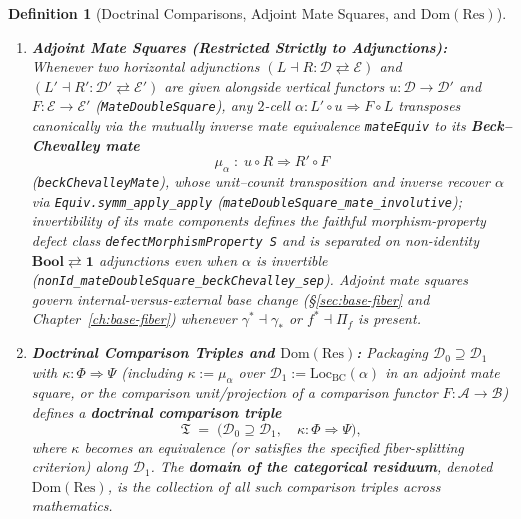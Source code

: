 \documentclass[10pt,twoside,openright]{book}
\theoremstyle{crmplain}
\theoremstyle{crmdef}
\newtheorem{definition}[theorem]{Definition}
\theoremstyle{crmremark}
\begin{document}
\begin{definition}[Doctrinal Comparisons, Adjoint Mate Squares, and $\mathrm{Dom}(\mathrm{Res})$]
\begin{enumerate}[label=\textup{(\roman*)},leftmargin=2.0em]
  \item \textbf{Adjoint Mate Squares (Restricted Strictly to Adjunctions):} Whenever two horizontal \emph{adjunctions} $(L \dashv R : \mathcal{D} \rightleftarrows \mathcal{E})$ and $(L' \dashv R' : \mathcal{D}' \rightleftarrows \mathcal{E}')$ are given alongside vertical functors $u : \mathcal{D} \to \mathcal{D}'$ and $F : \mathcal{E} \to \mathcal{E}'$ (\texttt{MateDoubleSquare}), any $2$-cell $\alpha : L' \circ u \Longrightarrow F \circ L$ transposes canonically via the mutually inverse mate equivalence \texttt{mateEquiv} to its \textbf{Beck--Chevalley mate}
  \[
    \mu_\alpha \;:\; u \circ R \Longrightarrow R' \circ F
  \]
  (\texttt{beckChevalleyMate}), whose unit--counit transposition and inverse recover $\alpha$ via \texttt{Equiv.symm\_\allowbreak apply\_\allowbreak apply} (\texttt{mateDoubleSquare\_\allowbreak mate\_\allowbreak involutive}); invertibility of its mate components defines the faithful morphism-property defect class \texttt{defectMorphismProperty S} and is separated on non-identity $\mathbf{Bool} \rightleftarrows \mathbf{1}$ adjunctions even when $\alpha$ is invertible (\texttt{nonId\_\allowbreak mateDoubleSquare\_\allowbreak beckChevalley\_\allowbreak sep}). Adjoint mate squares govern internal-versus-external base change (§\ref{sec:base-fiber} and Chapter~\ref{ch:base-fiber}) whenever $\gamma^* \dashv \gamma_*$ or $f^* \dashv \Pi_f$ is present.
  \item \textbf{Doctrinal Comparison Triples and $\mathrm{Dom}(\mathrm{Res})$:} Packaging $\mathcal{D}_0 \supseteq \mathcal{D}_1$ with $\kappa : \Phi \Rightarrow \Psi$ (including $\kappa := \mu_\alpha$ over $\mathcal{D}_1 := \mathrm{Loc}_{\mathrm{BC}}(\alpha)$ in an adjoint mate square, or the comparison unit/projection of a comparison functor $F : \mathcal{A} \to \mathcal{B}$) defines a \textbf{doctrinal comparison triple}
  \[
    \mathfrak{T} \;=\; \bigl(\mathcal{D}_0 \supseteq \mathcal{D}_1, \quad \kappa : \Phi \Longrightarrow \Psi\bigr),
  \]
  where $\kappa$ becomes an equivalence (or satisfies the specified fiber-splitting criterion) along $\mathcal{D}_1$. The \textbf{domain of the categorical residuum}, denoted $\mathrm{Dom}(\mathrm{Res})$, is the collection of all such comparison triples across mathematics.
\end{enumerate}
\end{definition}
\end{document}

